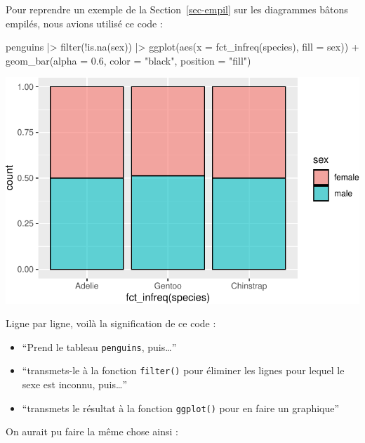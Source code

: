 \documentclass[
  a4paper,
  DIV=11,
  numbers=noendperiod,
  oneside]{scrreprt}
\newenvironment{Shaded}{}{}
\newcommand{\AttributeTok}[1]{\textcolor[rgb]{0.84,0.23,0.29}{#1}}
\newcommand{\FloatTok}[1]{\textcolor[rgb]{0.00,0.36,0.77}{#1}}
\newcommand{\FunctionTok}[1]{\textcolor[rgb]{0.44,0.26,0.76}{#1}}
\newcommand{\NormalTok}[1]{\textcolor[rgb]{0.14,0.16,0.18}{#1}}
\newcommand{\SpecialCharTok}[1]{\textcolor[rgb]{0.00,0.36,0.77}{#1}}
\newcommand{\StringTok}[1]{\textcolor[rgb]{0.01,0.18,0.38}{#1}}
\providecommand{\tightlist}{%
  \setlength{\itemsep}{0pt}\setlength{\parskip}{0pt}}\usepackage{longtable,booktabs,array}
\begin{document}
Pour reprendre un exemple de la Section~\ref{sec-empil} sur les
diagrammes bâtons empilés, nous avions utilisé ce code :

\begin{Shaded}
\begin{Highlighting}[]
\NormalTok{penguins }\SpecialCharTok{|\textgreater{}} 
  \FunctionTok{filter}\NormalTok{(}\SpecialCharTok{!}\FunctionTok{is.na}\NormalTok{(sex)) }\SpecialCharTok{|\textgreater{}} 
  \FunctionTok{ggplot}\NormalTok{(}\FunctionTok{aes}\NormalTok{(}\AttributeTok{x =} \FunctionTok{fct\_infreq}\NormalTok{(species), }\AttributeTok{fill =}\NormalTok{ sex)) }\SpecialCharTok{+}
  \FunctionTok{geom\_bar}\NormalTok{(}\AttributeTok{alpha =} \FloatTok{0.6}\NormalTok{, }\AttributeTok{color =} \StringTok{"black"}\NormalTok{, }\AttributeTok{position =} \StringTok{"fill"}\NormalTok{)}
\end{Highlighting}
\end{Shaded}

\includegraphics{04-DataWrangling_files/figure-pdf/unnamed-chunk-13-1.pdf}

Ligne par ligne, voilà la signification de ce code :

\begin{itemize}
\tightlist
\item
  ``Prend le tableau \texttt{penguins}, puis\ldots{}''
\item
  ``transmets-le à la fonction \texttt{filter()} pour éliminer les
  lignes pour lequel le sexe est inconnu, puis\ldots{}''
\item
  ``transmets le résultat à la fonction \texttt{ggplot()} pour en faire
  un graphique''
\end{itemize}

On aurait pu faire la même chose ainsi :
\end{document}
